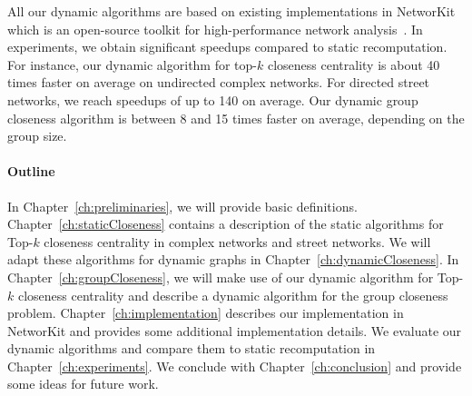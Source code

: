 All our dynamic algorithms are based on existing implementations in NetworKit which is an open-source toolkit for high-performance network analysis~\cite{staudt2014networkit}. In experiments, we obtain significant speedups compared to static recomputation. For instance, our dynamic algorithm for top-$k$ closeness centrality is about 40 times faster on average on undirected complex networks. For directed street networks, we reach speedups of up to 140 on average. Our dynamic group closeness algorithm is between 8 and 15 times faster on average, depending on the group size.

\paragraph{Outline}
In Chapter~\ref{ch:preliminaries}, we will provide basic definitions. Chapter~\ref{ch:staticCloseness} contains a description of the static algorithms for Top-$k$ closeness centrality in complex networks and street networks. We will adapt these algorithms for dynamic graphs in Chapter~\ref{ch:dynamicCloseness}. In Chapter~\ref{ch:groupCloseness}, we will make use of our dynamic algorithm for Top-$k$ closeness centrality and describe a dynamic algorithm for the group closeness problem. Chapter~\ref{ch:implementation} describes our implementation in NetworKit and provides some additional implementation details. We evaluate our dynamic algorithms and compare them to static recomputation in Chapter~\ref{ch:experiments}. We conclude with Chapter~\ref{ch:conclusion} and provide some ideas for future work.